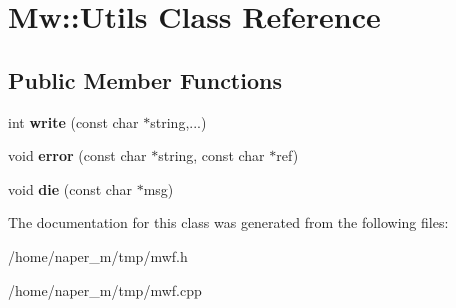\hypertarget{class_mw_1_1_utils}{\section{Mw\-:\-:Utils Class Reference}
\label{class_mw_1_1_utils}
}
\subsection*{Public Member Functions}
\begin{DoxyCompactItemize}
\item 
\hypertarget{class_mw_1_1_utils_a8f01b11880c79410e85f982d3caf0612}{int {\bfseries write} (const char $\ast$string,...)}\label{class_mw_1_1_utils_a8f01b11880c79410e85f982d3caf0612}

\item 
\hypertarget{class_mw_1_1_utils_ab99ba29140629cde79ed1329e5283e5b}{void {\bfseries error} (const char $\ast$string, const char $\ast$ref)}\label{class_mw_1_1_utils_ab99ba29140629cde79ed1329e5283e5b}

\item 
\hypertarget{class_mw_1_1_utils_a12e9dbc5c06b4edb5566f57cad7fd5e8}{void {\bfseries die} (const char $\ast$msg)}\label{class_mw_1_1_utils_a12e9dbc5c06b4edb5566f57cad7fd5e8}

\end{DoxyCompactItemize}


The documentation for this class was generated from the following files\-:\begin{DoxyCompactItemize}
\item 
/home/naper\-\_\-m/tmp/mwf.\-h\item 
/home/naper\-\_\-m/tmp/mwf.\-cpp\end{DoxyCompactItemize}
